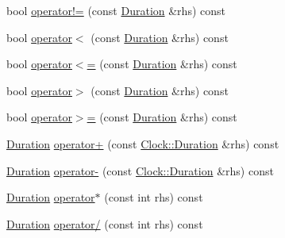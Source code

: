 \begin{DoxyCompactItemize}
\item 
bool \hyperlink{class_clock_1_1_duration_a1af85a78ef8095c649379336f8ae8bcc}{operator!=} (const \hyperlink{class_clock_1_1_duration}{Duration} \&rhs) const 
\item 
bool \hyperlink{class_clock_1_1_duration_ac605b0e00447315bafb9c6a787779d78}{operator$<$} (const \hyperlink{class_clock_1_1_duration}{Duration} \&rhs) const 
\item 
bool \hyperlink{class_clock_1_1_duration_af1c12774f3a82539a559e59e666ccdfe}{operator$<$=} (const \hyperlink{class_clock_1_1_duration}{Duration} \&rhs) const 
\item 
bool \hyperlink{class_clock_1_1_duration_a34de110bc0e3decf11477963d4fc0091}{operator$>$} (const \hyperlink{class_clock_1_1_duration}{Duration} \&rhs) const 
\item 
bool \hyperlink{class_clock_1_1_duration_af36b0327c8d39df60c992927ef6cd181}{operator$>$=} (const \hyperlink{class_clock_1_1_duration}{Duration} \&rhs) const 
\item 
\hyperlink{class_clock_1_1_duration}{Duration} \hyperlink{class_clock_1_1_duration_a736c29f90be11973e96cef8b90bb3cff}{operator+} (const \hyperlink{class_clock_1_1_duration}{Clock\+::\+Duration} \&rhs) const 
\item 
\hyperlink{class_clock_1_1_duration}{Duration} \hyperlink{class_clock_1_1_duration_ae3a7fadb1696d6997da5d4eb6d6c20f1}{operator-\/} (const \hyperlink{class_clock_1_1_duration}{Clock\+::\+Duration} \&rhs) const 
\item 
\hyperlink{class_clock_1_1_duration}{Duration} \hyperlink{class_clock_1_1_duration_aeb9a3ad2c7e98006f00ce9db1fbd57f5}{operator$\ast$} (const int rhs) const 
\item 
\hyperlink{class_clock_1_1_duration}{Duration} \hyperlink{class_clock_1_1_duration_a314a0d6b462c12f984a6700330227dfe}{operator/} (const int rhs) const 
\end{DoxyCompactItemize}
